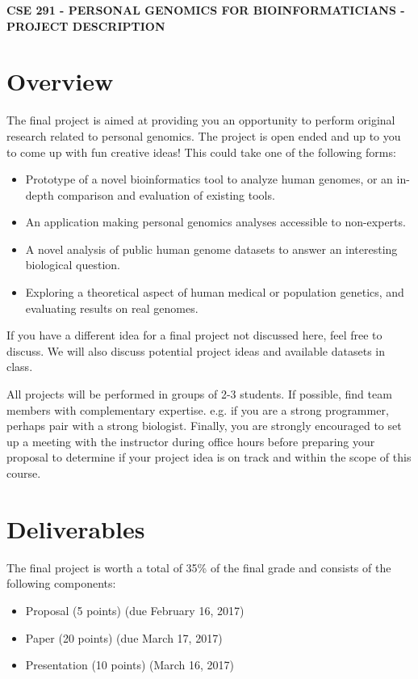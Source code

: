 \documentclass[12pt]{article}
\begin{document}
\textbf{CSE 291 - PERSONAL GENOMICS FOR BIOINFORMATICIANS - PROJECT DESCRIPTION}

\section*{Overview}
The final project is aimed at providing you an opportunity to perform original research related to personal genomics. The project is open ended and up to you to come up with fun creative ideas! This could take one of the following forms:

\begin{itemize}
\setlength\itemsep{0.0em}
\item Prototype of a novel bioinformatics tool to analyze human genomes, or an in-depth comparison and evaluation of existing tools.
\item An application making personal genomics analyses accessible to non-experts.
\item A novel analysis of public human genome datasets to answer an interesting biological question.
\item Exploring a theoretical aspect of human medical or population genetics, and evaluating results on real genomes.
\end{itemize}

If you have a different idea for a final project not discussed here, feel free to discuss. We will also discuss potential project ideas and available datasets in class.

All projects will be performed in groups of 2-3 students. If possible, find team members with complementary expertise. e.g. if you are a strong programmer, perhaps pair with a strong biologist. Finally, you are strongly encouraged to set up a meeting with the instructor during office hours before preparing your proposal to determine if your project idea is on track and within the scope of this course.

\section*{Deliverables}
The final project is worth a total of 35\% of the final grade and consists of the following components:

\begin{itemize}
\setlength\itemsep{0.0em}
\item Proposal (5 points) (due February 16, 2017)
\item Paper (20 points)  (due March 17, 2017)
\item Presentation (10 points) (March 16, 2017)
\end{itemize}
\end{document}
